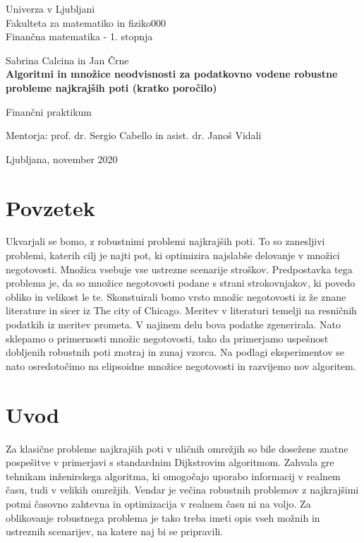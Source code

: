 \documentclass[a4paper, 12 pt]{article}
\theoremstyle{plain}
\theoremstyle{definition}
\theoremstyle{remark}
\begin{document}
\begin{titlepage}
		\begin{center}
		
		\large
		Univerza v Ljubljani\\
		\normalsize
		Fakulteta za matematiko in fiziko000\\
		
		\small
		Finančna matematika - 1. stopnja\\
		
		\vspace{5 cm} 
		
		\large
		Sabrina Calcina in Jan Črne \\
		
		\vspace{0.5cm}
		\Large
		\textbf{Algoritmi in množice neodvisnosti za podatkovno vodene robustne probleme najkrajših poti  (kratko poročilo)}
		
		\vspace{0.5 cm}
		\normalsize
		Finančni praktikum
		
		\vspace{1.5cm}
		\normalsize
		Mentorja: prof. dr. Sergio Cabello in asist. dr. Janoš Vidali
		
		\vfill
		
		\large Ljubljana, november 2020
		
		\end{center}
\end{titlepage}

\section{Povzetek}

Ukvarjali se bomo, z  robustnimi problemi najkrajših poti. To so zanesljivi problemi, katerih cilj je najti pot, ki optimizira najslabše delovanje v množici negotovosti. Množica vsebuje vse ustrezne scenarije stroškov.
Predpostavka tega problema je, da so množice negotovosti podane s strani strokovnjakov, ki povedo obliko in velikost le te.
Skonstuirali bomo vrsto množic negotovosti iz že znane literature in sicer iz The city of Chicago. Meritev v literaturi temelji na resničnih podatkih iz meritev prometa. V najinem delu bova podatke zgenerirala. Nato sklepamo o primernosti množic negotovosti, tako da primerjamo uspešnost dobljenih robustnih poti znotraj in zunaj vzorca. 
Na podlagi eksperimentov se nato osredotočimo na elipsoidne množice negotovosti in razvijemo nov algoritem.

\section{Uvod}
Za klasične probleme najkrajših poti v uličnih omrežjih so bile dosežene znatne pospešitve v primerjavi s standardnim Dijkstrovim algoritmom. Zahvala gre tehnikam inženirskega algoritma, ki omogočajo uporabo informacij v realnem času, tudi v velikih omrežjih.
Vendar je večina robustnih problemov z najkrajšimi potmi časovno zahtevna in optimizacija v realnem času ni na voljo. Za oblikovanje robustnega problema je tako treba imeti opis vseh možnih in ustreznih scenarijev, na katere naj bi se pripravili.\newline
\end{document}

